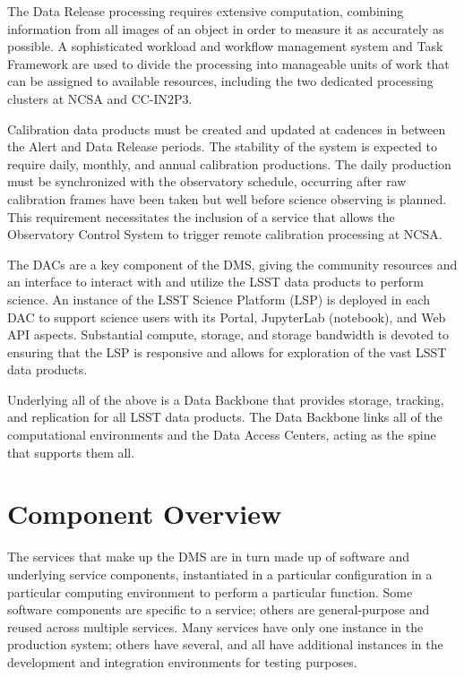 \documentclass[DM,toc]{lsstdoc}
\begin{document}
The Data Release processing requires extensive computation, combining
information from all images of an object in order to measure it as
accurately as possible.  A sophisticated workload and workflow management
system and Task Framework are used to divide the processing into
manageable units of work that can be assigned to available resources,
including the two dedicated processing clusters at NCSA and CC-IN2P3.

Calibration data products must be created and updated at cadences in between
the Alert and Data Release periods.  The stability of the system is expected to
require daily, monthly, and annual calibration productions.  The daily
production must be synchronized with the observatory schedule, occurring after
raw calibration frames have been taken but well before science observing is
planned.  This requirement necessitates the inclusion of a service that allows
the Observatory Control System to trigger remote calibration processing at
NCSA.

The DACs are a key component of the DMS, giving the community resources and an
interface to interact with and utilize the LSST data products to perform
science.  An instance of the LSST Science Platform (LSP) is deployed in each
DAC to support science users with its Portal, JupyterLab (notebook), and Web
API aspects.  Substantial compute, storage, and storage bandwidth is devoted to
ensuring that the LSP is responsive and allows for exploration of the vast
LSST data products.

Underlying all of the above is a Data Backbone that provides storage, tracking,
and replication for all LSST data products.  The Data Backbone links all of the
computational environments and the Data Access Centers, acting as the spine that
supports them all.



\section{Component Overview}\label{component-overview}

The services that make up the DMS are in turn made up of software and
underlying service components, instantiated in a particular
configuration in a particular computing environment to perform a
particular function. Some software components are specific to a service;
others are general-purpose and reused across multiple services. Many
services have only one instance in the production system; others have
several, and all have additional instances in the development and
integration environments for testing purposes.
\end{document}
